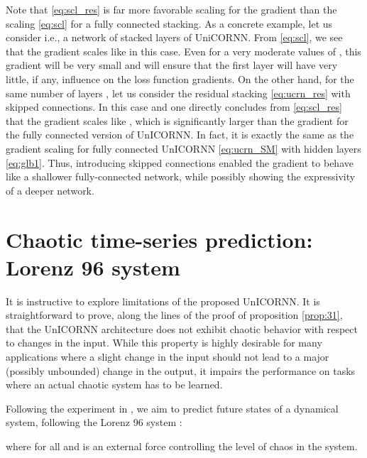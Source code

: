 \documentclass{article}
\begin{document}
Note that \eqref{eq:scl_res} is far more favorable scaling for the gradient than the scaling \eqref{eq:scl} for a fully connected stacking. As a concrete example, let us consider  i.e., a network of  stacked layers of UniCORNN. From \eqref{eq:scl}, we see that the gradient scales like  in this case. Even for a very moderate values of , this gradient will be very small and will ensure that the first layer will have very little, if any, influence on the loss function gradients. On the other hand, for the same number of layers , let us consider the residual stacking \eqref{eq:ucrn_res} with  skipped connections. In this case  and one directly concludes from \eqref{eq:scl_res} that the gradient scales like , which is significantly larger than the gradient for the fully connected version of UnICORNN. In fact, it is exactly the same as the gradient scaling for fully connected UnICORNN \eqref{eq:ucrn_SM} with  hidden layers \eqref{eq:glb1}. Thus, introducing skipped connections enabled the gradient to behave like a shallower fully-connected network, while possibly showing the expressivity of a deeper network.  


\section{Chaotic time-series prediction: Lorenz 96 system}
It is instructive to explore limitations of the proposed UnICORNN. It is straightforward to prove, along the lines of the proof of proposition \ref{prop:31}, that the UnICORNN architecture does not exhibit chaotic behavior with respect to changes in the input. While this property is highly desirable for many applications where a slight change in the input should not lead to a major (possibly unbounded) change in the output, it impairs the performance on tasks where an actual chaotic system has to be learned.

Following the experiment in \cite{coRNN}, we aim to predict future states of a dynamical system, following the Lorenz 96 system \citep{lorenz96}:

where  for all  and  is an external force controlling the level of chaos in the system. 
\end{document}

